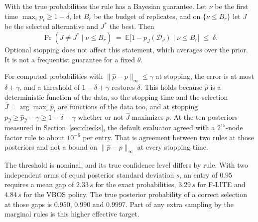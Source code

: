 \documentclass[11pt]{article}
\begin{document}
With the true probabilities the rule has a Bayesian guarantee. Let
$\nu$ be the first time $\max_i p_i \ge 1 - \delta$, let $B_r$ be
the budget of replicates, and on $\{\nu \le B_r\}$ let $J$ be the
selected alternative and $J^*$ the best. Then
\begin{equation}
\Pr(J \ne J^* \mid \nu \le B_r)
\;=\; \mathbb{E}\bigl[1 - p_J(\mathcal{D}_\nu) \mid \nu \le B_r\bigr]
\;\le\; \delta .
\end{equation}
Optional stopping does not affect this statement, which averages over
the prior. It is not a frequentist guarantee for a fixed $\theta$.

For computed probabilities with $\|\hat p - p\|_\infty \le \gamma$ at
stopping, the error is at most $\delta + \gamma$, and a threshold of
$1 - \delta + \gamma$ restores $\delta$. This holds because $\hat p$ is
a deterministic function of the data, so the stopping time and the
selection $\hat J=\arg\max_i\hat p_i$ are functions of the data too,
and at stopping $p_{\hat J}\ge\hat p_{\hat J}-\gamma\ge1-\delta-\gamma$
whether or not $\hat J$ maximizes $p$. At the ten posteriors measured
in Section~\ref{sec:checks}, the default evaluator agreed with a
$2^{15}$-node factor rule to about $10^{-6}$ per entry. That is
agreement between two rules at those posteriors and not a bound on
$\|\hat p - p\|_\infty$ at every stopping time.

The threshold is nominal, and its true confidence level differs by
rule. With two independent arms of equal posterior standard
deviation $s$, an entry of $0.95$ requires a mean gap of $2.33\,s$
for the exact probabilities, $3.29\,s$ for F-LITE and $4.84\,s$ for
the VBOS policy. The true posterior probability of a correct
selection at those gaps is $0.950$, $0.990$ and $0.9997$. Part of
any extra sampling by the marginal rules is this higher effective
target.
\end{document}
